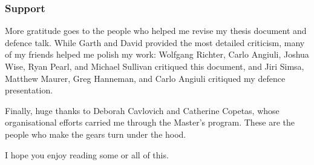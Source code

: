 \subsubsection{Support}

More gratitude goes to the people who helped me revise my thesis document and defence talk. While Garth and David provided the most detailed criticism, many of my friends helped me polish my work: Wolfgang Richter, Carlo Angiuli, Joshua Wise, Ryan Pearl, and Michael Sullivan critiqued this document, and Jiri Simsa, Matthew Maurer, Greg Hanneman, and Carlo Angiuli critiqued my defence presentation.

Finally, huge thanks to Deborah Cavlovich and Catherine Copetas, whose organisational efforts carried me through the Master's program. These are the people who make the gears turn under the hood.

\vspace{0.5in}

\noindent I hope you enjoy reading some or all of this.
